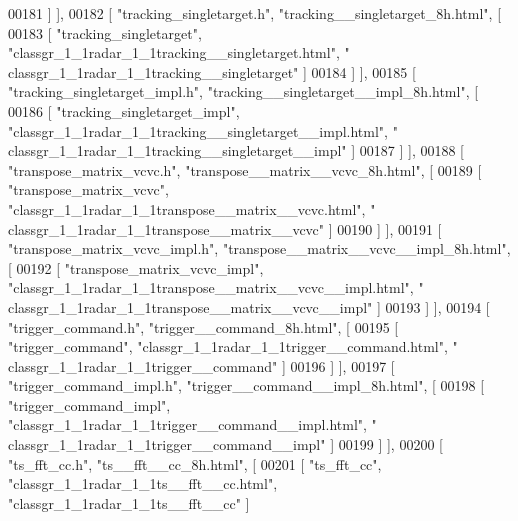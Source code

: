 \begin{DoxyCode}
00181     ] ],
00182     [ \textcolor{stringliteral}{"tracking\_singletarget.h"}, \textcolor{stringliteral}{"tracking\_\_singletarget\_8h.html"}, [
00183       [ \textcolor{stringliteral}{"tracking\_singletarget"}, \textcolor{stringliteral}{"classgr\_1\_1radar\_1\_1tracking\_\_singletarget.html"}, \textcolor{stringliteral}{"
      classgr\_1\_1radar\_1\_1tracking\_\_singletarget"} ]
00184     ] ],
00185     [ \textcolor{stringliteral}{"tracking\_singletarget\_impl.h"}, \textcolor{stringliteral}{"tracking\_\_singletarget\_\_impl\_8h.html"}, [
00186       [ \textcolor{stringliteral}{"tracking\_singletarget\_impl"}, \textcolor{stringliteral}{"classgr\_1\_1radar\_1\_1tracking\_\_singletarget\_\_impl.html"}, \textcolor{stringliteral}{"
      classgr\_1\_1radar\_1\_1tracking\_\_singletarget\_\_impl"} ]
00187     ] ],
00188     [ \textcolor{stringliteral}{"transpose\_matrix\_vcvc.h"}, \textcolor{stringliteral}{"transpose\_\_matrix\_\_vcvc\_8h.html"}, [
00189       [ \textcolor{stringliteral}{"transpose\_matrix\_vcvc"}, \textcolor{stringliteral}{"classgr\_1\_1radar\_1\_1transpose\_\_matrix\_\_vcvc.html"}, \textcolor{stringliteral}{"
      classgr\_1\_1radar\_1\_1transpose\_\_matrix\_\_vcvc"} ]
00190     ] ],
00191     [ \textcolor{stringliteral}{"transpose\_matrix\_vcvc\_impl.h"}, \textcolor{stringliteral}{"transpose\_\_matrix\_\_vcvc\_\_impl\_8h.html"}, [
00192       [ \textcolor{stringliteral}{"transpose\_matrix\_vcvc\_impl"}, \textcolor{stringliteral}{"classgr\_1\_1radar\_1\_1transpose\_\_matrix\_\_vcvc\_\_impl.html"}, \textcolor{stringliteral}{"
      classgr\_1\_1radar\_1\_1transpose\_\_matrix\_\_vcvc\_\_impl"} ]
00193     ] ],
00194     [ \textcolor{stringliteral}{"trigger\_command.h"}, \textcolor{stringliteral}{"trigger\_\_command\_8h.html"}, [
00195       [ \textcolor{stringliteral}{"trigger\_command"}, \textcolor{stringliteral}{"classgr\_1\_1radar\_1\_1trigger\_\_command.html"}, \textcolor{stringliteral}{"
      classgr\_1\_1radar\_1\_1trigger\_\_command"} ]
00196     ] ],
00197     [ \textcolor{stringliteral}{"trigger\_command\_impl.h"}, \textcolor{stringliteral}{"trigger\_\_command\_\_impl\_8h.html"}, [
00198       [ \textcolor{stringliteral}{"trigger\_command\_impl"}, \textcolor{stringliteral}{"classgr\_1\_1radar\_1\_1trigger\_\_command\_\_impl.html"}, \textcolor{stringliteral}{"
      classgr\_1\_1radar\_1\_1trigger\_\_command\_\_impl"} ]
00199     ] ],
00200     [ \textcolor{stringliteral}{"ts\_fft\_cc.h"}, \textcolor{stringliteral}{"ts\_\_fft\_\_cc\_8h.html"}, [
00201       [ \textcolor{stringliteral}{"ts\_fft\_cc"}, \textcolor{stringliteral}{"classgr\_1\_1radar\_1\_1ts\_\_fft\_\_cc.html"}, \textcolor{stringliteral}{"classgr\_1\_1radar\_1\_1ts\_\_fft\_\_cc"} ]

\end{DoxyCode}
